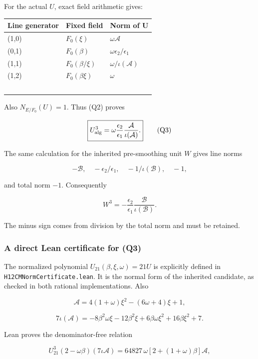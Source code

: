 For the actual \(U\), exact field arithmetic gives:

\begin{longtable}[]{@{}lll@{}}
\toprule\noalign{}
Line generator & Fixed field & Norm of U \\
\midrule\noalign{}
\endhead
\bottomrule\noalign{}
\endlastfoot
(1,0) & \(F_0(\xi)\) & \(\omega\mathcal A\) \\
(0,1) & \(F_0(\beta)\) & \(\omega\epsilon_2/\epsilon_1\) \\
(1,1) & \(F_0(\beta/\xi)\) & \(\omega/\iota(\mathcal A)\) \\
(1,2) & \(F_0(\beta\xi)\) & \(\omega\) \\\
\end{longtable}

Also \(N_{E/F_0}(U)=1\). Thus (Q2) proves

\[
 \boxed{
 U_{\rm alg}^3=\omega\frac{\epsilon_2}{\epsilon_1}
                 \frac{\mathcal A}{\iota(\mathcal A)}.
 } \tag{Q3}
\]

The same calculation for the inherited pre-smoothing unit \(W\) gives
line norms

\[
 -\mathcal B,\quad -\epsilon_2/\epsilon_1,\quad
 -1/\iota(\mathcal B),\quad -1,
\]

and total norm \(-1\). Consequently

\[
 \boxed{W^3=-\frac{\epsilon_2}{\epsilon_1}
                   \frac{\mathcal B}{\iota(\mathcal B)}.} \tag{Q4}
\]

The minus sign comes from division by the total norm and must be
retained.

\hypertarget{Q-a-direct-lean-certificate-for-q3}{%
\subsubsection{A direct Lean certificate for
(Q3)}\label{Q-a-direct-lean-certificate-for-q3}}

The normalized polynomial \(U_{21}(\beta,\xi,\omega)=21U\) is explicitly
defined in \texttt{H12CMNormCertificate.lean}. It is the normal form of
the inherited candidate, as checked in both rational implementations.
Also

\[
 \mathcal A=4(1+\omega)\xi^2-(6\omega+4)\xi+1,
\]

\[
 7\iota(\mathcal A)
 =-8\beta^2\omega\xi-12\beta^2\xi
    +6\beta\omega\xi^2+16\beta\xi^2+7.
\]

Lean proves the denominator-free relation

\[
 U_{21}^3(2-\omega\beta)(7\iota\mathcal A)
 =64827\,\omega[2+(1+\omega)\beta]\mathcal A,
\]

